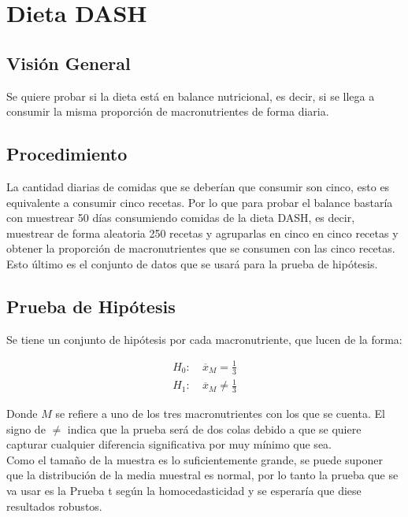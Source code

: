 \documentclass[12pt,a4paper]{article}
\begin{document}
    \section{Dieta DASH}
    {  
        \subsection{Visión General}
        {
            Se quiere probar si la dieta está en balance nutricional, es decir, 
            si se llega a consumir la misma proporción de macronutrientes 
            de forma diaria.
        }

        \subsection{Procedimiento}
        {
            La cantidad diarias de comidas que se deberían que consumir son cinco, 
            esto es equivalente a consumir cinco recetas. Por lo que para probar 
            el balance bastaría con muestrear 50 días consumiendo comidas de la 
            dieta DASH, es decir, muestrear de forma aleatoria 250 recetas y agruparlas 
            en cinco en cinco recetas y obtener la proporción de macronutrientes que 
            se consumen con las cinco recetas. Esto último es el conjunto de datos 
            que se usará para la prueba de hipótesis.
        }

        \subsection{Prueba de Hipótesis}
        {
            Se tiene un conjunto de hipótesis por cada macronutriente, que lucen 
            de la forma:

            \begin{align*}
                H_0 :&\ \overline{x}_{M} = \frac{1}{3} \\ 
                H_1 :&\ \overline{x}_{M} \ne \frac{1}{3}
            \end{align*}

            Donde $M$ se refiere a uno de los tres macronutrientes con los que 
            se cuenta. El signo de $\ne$ indica que la prueba será de dos colas 
            debido a que se quiere capturar cualquier diferencia significativa 
            por muy mínimo que sea.\\

            Como el tamaño de la muestra es lo suficientemente grande, se puede 
            suponer que la distribución de la media muestral es normal, por lo 
            tanto la prueba que se va usar es la Prueba t según la homocedasticidad y se esperaría que 
            diese resultados robustos.
        }

    }
\end{document}

